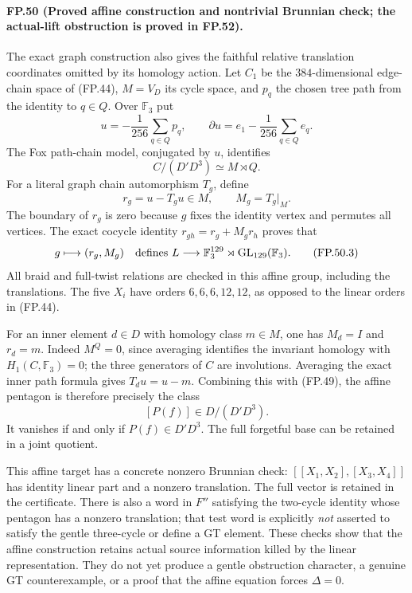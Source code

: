 \paragraph{FP.50 (Proved affine construction and nontrivial Brunnian check; the actual-lift obstruction is proved in FP.52).}
The exact graph construction also gives the faithful
relative translation coordinates omitted by its homology
action. Let $C_1$ be the $384$-dimensional edge-chain space
of (FP.44), $M=V_D$ its cycle space, and $p_q$ the chosen
tree path from the identity to $q\in Q$. Over $\mathbb F_3$ put
\[
 u=-\frac1{256}\sum_{q\in Q}p_q,
 \qquad \partial u=e_1-\frac1{256}\sum_{q\in Q}e_q.
 \tag{FP.50.1}
\]
The Fox path-chain model, conjugated by $u$, identifies
\[
          C/(D'D^3)\simeq M\rtimes Q.
\]
For a literal graph chain automorphism $T_g$, define
\[
                 r_g=u-T_gu\in M,
                 \qquad M_g=T_g|_M.
 \tag{FP.50.2}
\]
The boundary of $r_g$ is zero because $g$ fixes the identity
vertex and permutes all vertices. The exact cocycle identity
$r_{gh}=r_g+M_gr_h$ proves that
\[
             g\longmapsto(r_g,M_g)
       \quad\hbox{defines } L\longrightarrow
             \mathbb F_3^{129}\rtimes\operatorname{GL}_{129}(\mathbb F_3).
 \tag{FP.50.3}
\]
All braid and full-twist relations are checked in this
affine group, including the translations. The five $X_i$
have orders $6,6,6,12,12$, as opposed to the linear orders
in (FP.44).

For an inner element $d\in D$ with homology class $m\in M$,
one has $M_d=I$ and $r_d=m$. Indeed $M^Q=0$, since averaging
identifies the invariant homology with $H_1(C,\mathbb F_3)=0$;
the three generators of $C$ are involutions. Averaging the
exact inner path formula gives $T_du=u-m$.
Combining this with (FP.49), the affine pentagon is therefore
precisely the class
\[
                    [P(f)]\in D/(D'D^3).
 \tag{FP.50.4}
\]
It vanishes if and only if $P(f)\in D'D^3$.
The full forgetful base can be retained in a joint quotient.

This affine target has a concrete nonzero Brunnian check:
$[[X_1,X_2],[X_3,X_4]]$ has identity linear part and a
nonzero translation. The full vector is retained in the
certificate. There is also a word in $F''$ satisfying the
two-cycle identity whose pentagon has a nonzero translation;
that test word is explicitly \emph{not} asserted to satisfy
the gentle three-cycle or define a GT element. These checks
show that the affine construction retains actual source
information killed by the linear representation. They do
not yet produce a gentle obstruction character, a genuine
GT counterexample, or a proof that the affine equation
forces $\Delta=0$.

